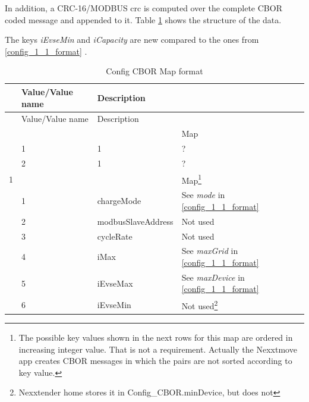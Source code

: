 \documentclass[a4paper]{article}
\newcommand{\secref}[1]{\ref{#1} \nameref{#1}}
\begin{document}
In addition, 
a CRC-16/MODBUS crc is computed over the complete CBOR coded message and appended to it.
Table \ref{table.34} shows the structure of the data.

The keys \emph{iEvseMin} and \emph{iCapacity} are new compared to the
ones from \secref{config_1_1_format}.

\begin{longtable}[]{@{}lllp{12cm}@{}}
	\caption{Config CBOR Map format}
	\label{table.34}
	\tabularnewline
	\toprule\noalign{}
	\multicolumn{2}{@{}l}{%
	Key} & Value/Value name & Description \\
	\midrule\noalign{}
	\endfirsthead
	\toprule\noalign{}
	\multicolumn{2}{@{}l}{%
	Key} & Value/Value name & Description \\
	\midrule\noalign{}
	\endhead
	\bottomrule\noalign{}
	\endlastfoot
	0 &    &                    & Map                                                                                 \\
	  & 1  & 1                  & ?                                                                                   \\
	  & 2  & 1                  & ?                                                                                   \\
	1 &    &                    & Map\footnote{The possible key values shown in the next rows for this map are        
	ordered in increasing integer value. 
	That is not a requirement.
	Actually the Nexxtmove app creates CBOR messages in which the pairs	are not sorted according to key value.}\\
	  & 1  & chargeMode         & See \emph{mode} in                                                                  
	\secref{config_1_1_format} \\
	  & 2  & modbusSlaveAddress & Not used                                                                            \\
	  & 3  & cycleRate          & Not used                                                                            \\
	  & 4  & iMax               & See \emph{maxGrid} in                                                               
	\secref{config_1_1_format} \\
	  & 5  & iEvseMax           & See \emph{maxDevice} in                                                             
	\secref{config_1_1_format} \\
	  & 6  & iEvseMin           & Not used\footnote{Nexxtender home stores it in Config\_CBOR.minDevice, but does not 
}
\end{longtable}
\end{document}

